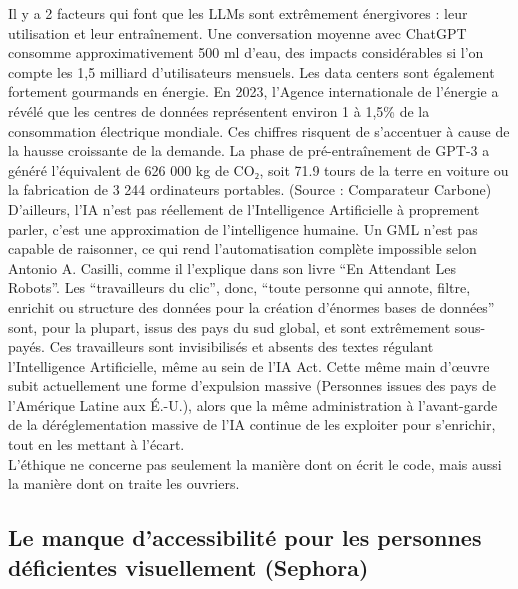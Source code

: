 \documentclass{article}
\begin{document}
Il y a 2 facteurs qui font que les LLMs sont extrêmement énergivores : leur utilisation et leur entraînement. Une conversation moyenne avec ChatGPT consomme approximativement 500 ml d’eau, des impacts considérables si l’on compte les 1,5 milliard d’utilisateurs mensuels. Les data centers sont également fortement gourmands en énergie. En 2023, l’Agence internationale de l’énergie a révélé que les centres de données représentent environ 1 à 1,5\% de la consommation électrique mondiale. Ces chiffres risquent de s'accentuer à cause de la hausse croissante de la demande. La phase de pré-entraînement de GPT-3 a généré l’équivalent de 626 000 kg de CO₂, soit 71.9 tours de la terre en voiture ou la fabrication de 3 244 ordinateurs portables. (Source : Comparateur Carbone)\\

D’ailleurs, l’IA n’est pas réellement de l’Intelligence Artificielle à proprement parler, c’est une approximation de l’intelligence humaine. Un GML n’est pas capable de raisonner, ce qui rend l’automatisation complète impossible selon Antonio A. Casilli, comme il l’explique dans son livre “En Attendant Les Robots”. Les “travailleurs du clic”, donc, “toute personne qui annote, filtre, enrichit ou structure des données pour la création d’énormes bases de données” sont, pour la plupart, issus des pays du sud global, et sont extrêmement sous-payés. Ces travailleurs sont invisibilisés et absents des textes régulant l’Intelligence Artificielle, même au sein de l’IA Act. Cette même main d’œuvre subit actuellement une forme d’expulsion massive (Personnes issues des pays de l’Amérique Latine aux É.-U.), alors que la même administration à l’avant-garde de la déréglementation massive de l’IA continue de les exploiter pour s’enrichir, tout en les mettant à l’écart.\\ 


L’éthique ne concerne pas seulement la manière dont on écrit le code, mais aussi la manière dont on traite les ouvriers.\\ 

\subsection{Le manque d'accessibilité pour les personnes déficientes visuellement (Sephora)}
\end{document}
